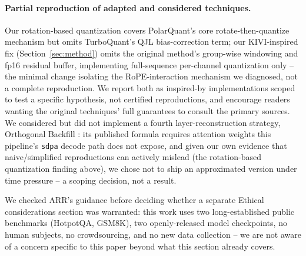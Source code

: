 \documentclass[11pt]{article}
\begin{document}
\paragraph{Partial reproduction of adapted and considered techniques.}
Our rotation-based quantization covers PolarQuant's core
rotate-then-quantize mechanism but omits TurboQuant's QJL bias-correction
term; our KIVI-inspired fix (Section~\ref{sec:method}) omits the original
method's group-wise windowing and fp16 residual buffer, implementing
full-sequence per-channel quantization only -- the minimal change
isolating the RoPE-interaction mechanism we diagnosed, not a complete
reproduction. We report both as inspired-by implementations scoped to
test a specific hypothesis, not certified reproductions, and encourage
readers wanting the original techniques' full guarantees to consult the
primary sources. We considered but did not implement a fourth
layer-reconstruction strategy, Orthogonal Backfill
\citep{orthobackfill2026}: its published formula requires attention
weights this pipeline's \texttt{sdpa} decode path does not expose, and
given our own evidence that naive/simplified reproductions can actively
mislead (the rotation-based quantization finding above), we chose not to
ship an approximated version under time pressure -- a scoping decision,
not a result.

We checked ARR's guidance before deciding whether a separate Ethical
considerations section was warranted: this work uses two long-established
public benchmarks (HotpotQA, GSM8K), two openly-released model
checkpoints, no human subjects, no crowdsourcing, and no new data
collection -- we are not aware of a concern specific to this paper beyond
what this section already covers.



\end{document}
